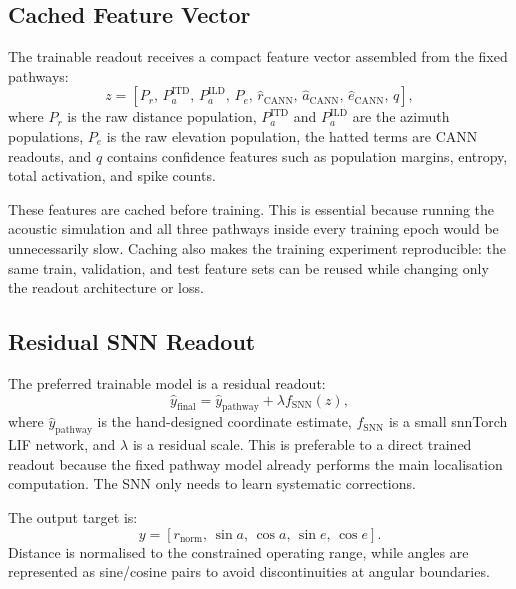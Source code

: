 \subsection{Cached Feature Vector}

The trainable readout receives a compact feature vector assembled from the fixed pathways:
\begin{equation}
    z =
    \left[
    P_r,\,
    P^{\text{ITD}}_a,\,
    P^{\text{ILD}}_a,\,
    P_e,\,
    \hat{r}_{\text{CANN}},\,
    \hat{a}_{\text{CANN}},\,
    \hat{e}_{\text{CANN}},\,
    q
    \right],
\end{equation}
where $P_r$ is the raw distance population, $P^{\text{ITD}}_a$ and $P^{\text{ILD}}_a$ are the azimuth populations, $P_e$ is the raw elevation population, the hatted terms are CANN readouts, and $q$ contains confidence features such as population margins, entropy, total activation, and spike counts.

These features are cached before training. This is essential because running the acoustic simulation and all three pathways inside every training epoch would be unnecessarily slow. Caching also makes the training experiment reproducible: the same train, validation, and test feature sets can be reused while changing only the readout architecture or loss.

\subsection{Residual SNN Readout}

The preferred trainable model is a residual readout:
\begin{equation}
    \hat{y}_{\text{final}} = \hat{y}_{\text{pathway}} + \lambda f_{\text{SNN}}(z),
\end{equation}
where $\hat{y}_{\text{pathway}}$ is the hand-designed coordinate estimate, $f_{\text{SNN}}$ is a small snnTorch LIF network, and $\lambda$ is a residual scale. This is preferable to a direct trained readout because the fixed pathway model already performs the main localisation computation. The SNN only needs to learn systematic corrections.

The output target is:
\begin{equation}
    y =
    \left[
    r_{\text{norm}},\,
    \sin a,\,
    \cos a,\,
    \sin e,\,
    \cos e
    \right].
\end{equation}
Distance is normalised to the constrained operating range, while angles are represented as sine/cosine pairs to avoid discontinuities at angular boundaries.

